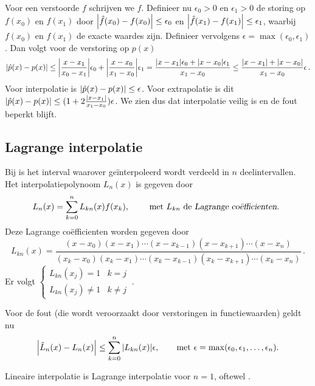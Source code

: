\documentclass{2wn20summary}
\begin{document}
			Voor een verstoorde $f$ schrijven we $\hat{f}$. Definieer nu $ \epsilon_0 > 0 $ en $ \epsilon_1 > 0 $ de storing op $ f(x_0) $ en $ f(x_1) $ door $ \abs{\hat{f}(x_0) - f(x_0)}\leq \epsilon_0 $ en $ \abs{\hat{f}(x_1) - f(x_1)} \leq \epsilon_1 $, waarbij $ f(x_0) $ en $ f(x_1) $ de exacte waardes zijn. Definieer vervolgens $ \epsilon = \max (\epsilon_0, \epsilon_1) $. Dan volgt voor de verstoring op $ p(x) $
			\[ 
				\abs{\hat{p}(x) - p(x)} \leq \abs{\frac{x-x_1}{x_0-x_1}}\epsilon_0 + \abs{\frac{x-x_0}{x_1-x_0}}\epsilon_1 = \frac{\abs{x-x_1}\epsilon_0+\abs{x-x_0}\epsilon_1}{x_1-x_0} \leq \frac{\abs{x-x_1}+\abs{x-x_0}}{x_1-x_0}\epsilon\,.
			\]
			Voor interpolatie is $ \abs{\hat{p}(x) - p(x)} \leq \epsilon$. Voor extrapolatie is dit $ \abs{\hat{p}(x) - p(x)} \leq (1 + 2 \frac{\abs{x-x_1}}{x_1-x_0})\epsilon $. We zien dus dat interpolatie veilig is en de fout beperkt blijft. 
		
		\subsection{Lagrange interpolatie}
			\begin{define}
				Bij  is het interval waarover ge\"interpoleerd wordt verdeeld in $n$ deelintervallen. Het interpolatiepolynoom $ L_n(x) $ is gegeven door
				\[ 
					L_n(x) = \sum_{k=0}^n L_{kn} (x) f(x_k), \qquad \text{ met $ L_{kn}$ de \indx{Lagrange co\"efficienten}. }
				\]
				Deze Lagrange co\"efficienten worden gegeven door
				\[ 
					L_{kn}(x) = \frac{(x-x_0)(x-x_1)\dotsm(x-x_{k-1})(x-x_{k+1})\dotsm(x-x_n)}{(x_k-x_0)(x_k-x_1)\dotsm(x_k-x_{k-1})(x_k-x_{k+1})\dotsm(x_k-x_n)}\,.
				\]
				Er volgt 
				$\begin{cases}
					L_{kn}(x_j) = 1 & k = j \\
					L_{kn}(x_j) \neq 1 & k \neq j
				\end{cases} \ $.
				
				Voor de fout (die wordt veroorzaakt door verstoringen in functiewaarden) geldt nu
				\[ 
					\abs{\hat{L}_n(x)-L_n(x)} \leq \sum_{k=0}^n \abs{L_{kn}(x)} \epsilon, \qquad \text{met } \epsilon = \max (\epsilon_0, \epsilon_1, \dotsc, \epsilon_n).
				\]
			\end{define}
			\begin{note}
				Lineaire interpolatie is Lagrange interpolatie voor $n=1$, oftewel .
			\end{note}
	
\end{document}
